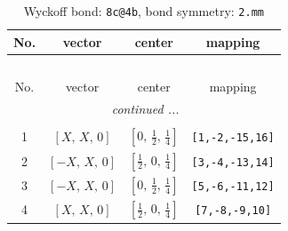 \documentclass[fleqn,8pt]{jsarticle}
\begin{document}
\renewcommand{\arraystretch}{1.2}
\begin{longtable}{cccc}
\caption{Wyckoff bond: {\tt 8c@4b}, bond symmetry: {\tt 2.mm}}
 \\
 \hline \hline
No. & vector & center & mapping \\ \hline \endfirsthead

\multicolumn{3}{l}{\tablename\ \thetable{}} \\
 \hline \hline
No. & vector & center & mapping \\ \hline \endhead

 \hline \hline
\multicolumn{3}{r}{\footnotesize\it continued ...} \\ \endfoot

 \hline \hline
\multicolumn{3}{r}{} \\ \endlastfoot

1 & $\left[ X,\, X,\, 0 \right]$ & $\left[ 0,\, \frac{1}{2},\, \frac{1}{4} \right]$ & {\tt [1,-2,-15,16]} \\ \hline
2 & $\left[ - X,\, X,\, 0 \right]$ & $\left[ \frac{1}{2},\, 0,\, \frac{1}{4} \right]$ & {\tt [3,-4,-13,14]} \\ \hline
3 & $\left[ - X,\, X,\, 0 \right]$ & $\left[ 0,\, \frac{1}{2},\, \frac{1}{4} \right]$ & {\tt [5,-6,-11,12]} \\ \hline
4 & $\left[ X,\, X,\, 0 \right]$ & $\left[ \frac{1}{2},\, 0,\, \frac{1}{4} \right]$ & {\tt [7,-8,-9,10]} \\
\end{longtable}
\renewcommand{\arraystretch}{1.2}
\end{document}
